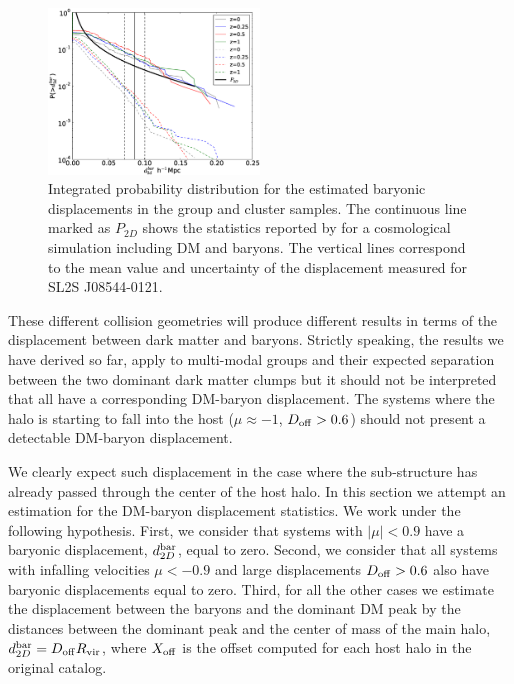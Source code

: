 \documentclass{emulateapj}
\newcommand{\bullg}{SL2S J08544-0121}
\begin{document}
\begin{figure}
\begin{center}
\includegraphics[width=0.5\textwidth]{figure_5.eps}
\end{center}
\caption{Integrated probability distribution for the estimated
  baryonic displacements in the group and cluster samples. The
  continuous line marked as $P_{2D}$ shows the statistics reported by
  \citet{ForeroRomero2010} for a cosmological simulation including DM
  and baryons. The vertical lines correspond to the mean value and
  uncertainty of the displacement measured for \bullg.}
\label{fig:baryonic_displacements}
\end{figure}

These different collision geometries will produce different results in
terms of the displacement between dark matter and baryons. Strictly
speaking, the results we have derived so far, apply to multi-modal groups and their
expected separation between the two dominant dark matter clumps but it
should not be interpreted that all have a corresponding DM-baryon
displacement. The systems where the halo is starting to fall into the
host ($\mu\approx-1$, $D_{\rm off}>0.6$) should not present a
detectable DM-baryon displacement. 


We clearly expect such displacement in the case where the
sub-structure has already passed through the center of the host
halo. In this section we attempt an estimation for the DM-baryon
displacement statistics. We work under the following
hypothesis. First, we consider that systems with $|\mu|<0.9$ have a
baryonic displacement, $d_{2D}^{\rm bar}$, equal to zero. Second, we
consider that all systems with infalling velocities $\mu<-0.9$ and
large displacements $D_{\rm off}>0.6$ also have baryonic displacements
equal to zero. Third, for all the other cases we estimate the
displacement between the baryons and the dominant DM peak by the
distances between the dominant peak and the center of mass of the main
halo, $d_{2D}^{\rm bar}=D_{\rm off} R_{\rm vir}$, where $X_{\rm off}$
is the offset computed for each host halo in the original catalog.
\end{document}
